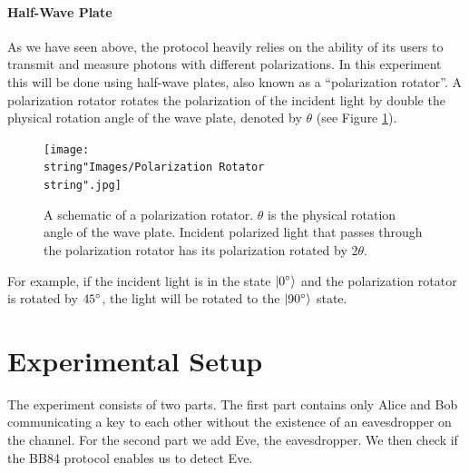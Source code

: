 \documentclass[reprint,amsmath,amssymb,aps, prl,superscriptaddress]{revtex4-2}
\begin{document}
\subsection*{Half-Wave Plate}
As we have seen above, the protocol heavily relies on the ability of its users to transmit and measure photons with different polarizations. In this experiment this will be done using half-wave plates, also known as a ``polarization rotator''. A polarization rotator rotates the polarization of the incident light by double the physical rotation angle of the wave plate, denoted by $\theta$ (see Figure \ref{fig:Polarization Rotator Schematic}).

\begin{figure}[H]
	\centering
	\texttt{[image: \\string"Images/Polarization Rotator\\string".jpg]}
	\caption{A schematic of a polarization rotator. $\theta$ is the physical rotation
angle of the wave plate. Incident polarized light that passes through
the polarization rotator has its polarization rotated by $2\theta$.
\label{fig:Polarization Rotator Schematic}}
\end{figure}
 For example, if the incident light is in the state $\ket{0^{\circ}}$
and the polarization rotator is rotated by $45^{\circ}$, the light will
be rotated to the $\ket{90^{\circ}}$ state.

\part*{Experimental Setup}
The experiment consists of two parts. The first part contains only Alice and Bob communicating a key to each other without the existence of an eavesdropper on the channel. For the second part we add Eve, the eavesdropper. We then check if the BB84 protocol enables us to detect Eve.
\end{document}
